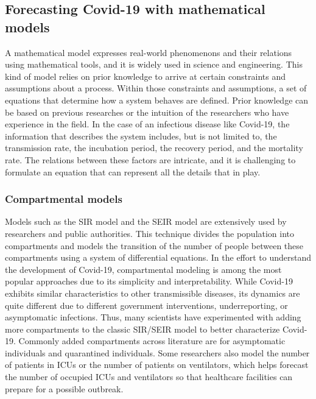 \subsection{Forecasting Covid-19 with mathematical models}

A mathematical model expresses real-world phenomenons and their relations using mathematical tools, and it is widely used in science and engineering.
This kind of model relies on prior knowledge to arrive at certain constraints and assumptions about a process.
Within those constraints and assumptions, a set of equations that determine how a system behaves are defined.
Prior knowledge can be based on previous researches or the intuition of the researchers who have experience in the field.
In the case of an infectious disease like Covid-19, the information that describes the system includes, but is not limited to, the transmission rate, the incubation period, the recovery period, and the mortality rate.
The relations between these factors are intricate, and it is challenging to formulate an equation that can represent all the details that in play.

\subsubsection{Compartmental models}

Models such as the \gls{SIR} model and the \gls{SEIR} model \cite{kermackContributionMathematicalTheory1927, kermackContributionsMathematicalTheory1932, kermackContributionsMathematicalTheory1933, brauerCompartmentalModelsEpidemiology2008} are extensively used by researchers and public authorities.
This technique divides the population into compartments and models the transition of the number of people between these compartments using a system of differential equations.
In the effort to understand the development of Covid-19, compartmental modeling is among the most popular approaches due to its simplicity and interpretability.
While Covid-19 exhibits similar characteristics to other transmissible diseases, its dynamics are quite different due to different government interventions, underreporting, or asymptomatic infections.
Thus, many scientists have experimented with adding more compartments to the classic \gls{SIR}/\gls{SEIR} model to better characterize Covid-19.
Commonly added compartments across literature are for asymptomatic individuals and quarantined individuals.
Some researchers also model the number of patients in \glspl{ICU} or the number of patients on ventilators, which helps forecast the number of occupied \glspl{ICU} and ventilators so that healthcare facilities can prepare for a possible outbreak.

